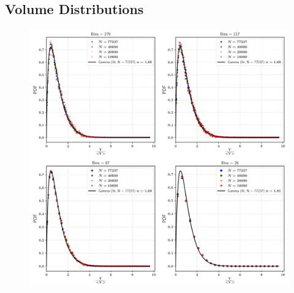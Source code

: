 

\subsection*{Volume Distributions}



\begin{figure}
\centering
\includegraphics{plots/drop_stats/short_time_volume_bins.pdf}
	\caption{\blindtext}
\label{t1_vol_bins}
\end{figure}





